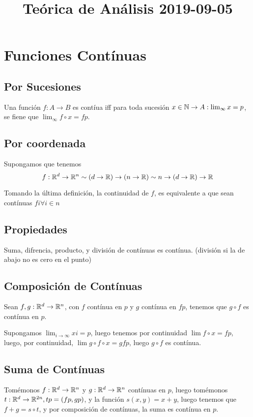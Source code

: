 \documentclass{article}
\title{Teórica de Análisis 2019-09-05}
\begin{document}
	\maketitle
	\section{Funciones Contínuas}
	\subsection{Por Sucesiones}
	Una función $f : A \to B$ es contíua iff para toda sucesión $x \in \mathbb{N} \to A :
	\lim_{\infty} x = p$,
	se fiene que $\lim_{\infty} f \circ x = fp$.

	\subsection{Por coordenada}
	Supongamos que tenemos
	\[f : \mathbb{R}^d \to \mathbb{R}^n \sim (d \to \mathbb{R}) \to (n \to \mathbb{R}) \sim
	n \to (d \to \mathbb{R}) \to \mathbb{R}\]

	Tomando la última definición,
	la continuidad de $f$, es equivalente a que sean contínuas $fi \forall i \in n$

	\subsection{Propiedades}
	Suma, difrencia, producto, y división de contínuas es contínua. (división
	si la de abajo no es cero en el punto)

	\subsection{Composición de Contínuas}
	Sean $f, g: \mathbb{R}^d \to \mathbb{R}^n$, con $f$ contínua en $p$ y $g$ contínua en $fp$,
	tenemos que $g \circ f$ es contínua en $p$.

	Supongamos $\lim_{i \to \infty} xi = p$, luego tenemos por continuidad
	$\lim f \circ x = fp$, luego, por continuidad, $\lim g \circ f \circ x = gfp$,
	luego $g \circ f$ es contínua.

	\subsection{Suma de Contínuas}
	Tomémonos $f : \mathbb{R}^d \to \mathbb{R}^n$ y $g : \mathbb{R}^d \to \mathbb{R}^n$ contínuas en $p$,
	luego tomémonos $t : \mathbb{R}^d \to \mathbb{R}^{2n}, tp = (fp, gp)$, y la función $s(x, y) = x+y$,
	luego tenemos que $f + g = s \circ t$, y por composición de contínuas, la suma es
	contínua en $p$.
\end{document}
